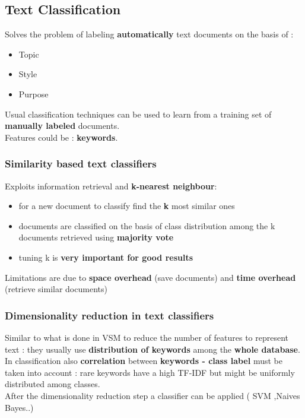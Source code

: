 \subsection{Text Classification}
Solves the problem of labeling \textbf{automatically} text documents on the basis of :
\begin{itemize}
\item Topic
\item Style
\item Purpose
\end{itemize}
Usual classification techniques can be used to learn from a training set of \textbf{manually labeled} documents.\\
Features could be : \textbf{keywords}.

\subsubsection{Similarity based text classifiers}
Exploits information retrieval and \textbf{k-nearest neighbour}:
\begin{itemize}
\item for a new document to classify find the \textbf{k} most similar ones
\item documents are classified on the basis of class distribution among the k documents retrieved using \textbf{majority vote}
\item tuning k is \textbf{very important for good results}
\end{itemize}
Limitations are due to \textbf{space overhead} (save documents) and \textbf{time overhead} (retrieve similar documents)

\subsubsection{Dimensionality reduction in text classifiers}
Similar to what is done in VSM to reduce the number of features to represent text : they usually use \textbf{distribution of keywords} among the \textbf{whole database}.\\
In classification also \textbf{correlation } between \textbf{keywords - class label} must be taken into account : rare keywords have a high TF-IDF but might be uniformly distributed among classes.\\
After the dimensionality reduction step a classifier can be applied ( SVM ,Naives Bayes..)

